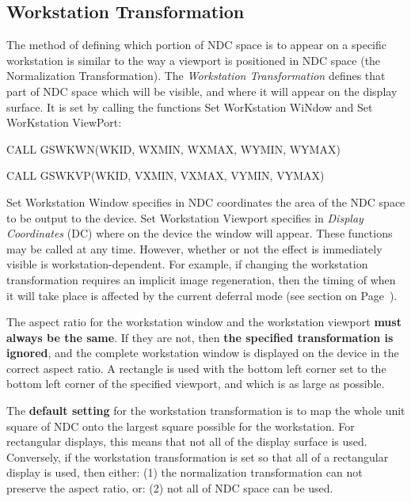 \subsection{\protect\label{sec:wstntfm}Workstation Transformation}
 
The method of defining which portion of NDC space is to appear on
a specific workstation is similar to the way a viewport is positioned
in NDC space (the Normalization Transformation). The {\it Workstation
Transformation} defines that part of NDC space which will be visible,
and where it will appear on the display surface.
It is set by calling the functions Set WorKstation WiNdow and
Set WorKstation ViewPort:
\begin{XMP}
CALL GSWKWN(WKID, WXMIN, WXMAX, WYMIN, WYMAX)
 
CALL GSWKVP(WKID, VXMIN, VXMAX, VYMIN, VYMAX)
\end{XMP}
Set Workstation Window specifies in NDC coordinates the area of the NDC
space to be output to the device. Set Workstation Viewport specifies in
{\it Display Coordinates} (DC) where on the device the window will appear.
These functions may be called at any time. However, whether or not
the effect is immediately visible is workstation-dependent.
For example, if changing the workstation transformation requires an
implicit image regeneration, then the timing of when it will take place
is affected by the current deferral mode (see section on Page~\pageref{sec:defsta}).
 
The aspect ratio for the workstation window and the workstation viewport
{\bf must always be the same}.
If they are not, then {\bf the specified transformation is ignored},
and the complete workstation window is displayed on the device
in the correct aspect ratio.
A rectangle is used with the bottom left corner set to the bottom
left corner of the specified viewport, and which is as large as possible.
 
The {\bf default setting} for the workstation transformation is
to map the whole unit square of NDC onto the largest square possible for the
workstation. For rectangular displays, this means that not all of
the display surface is used. Conversely, if the workstation
transformation is set so that all of a rectangular display is
used, then either: (1) the normalization transformation can not
preserve the aspect ratio, or: (2) not all of NDC space can be used.
 
